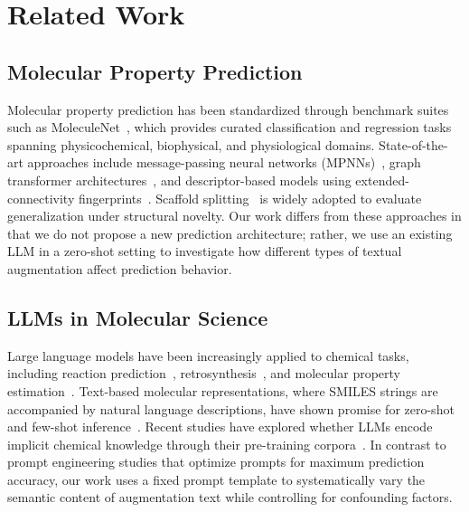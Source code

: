 \section{Related Work}
\label{sec:related_work}

\subsection{Molecular Property Prediction}
Molecular property prediction has been standardized through benchmark suites such as MoleculeNet~\cite{wu2018moleculenet}, which provides curated classification and regression tasks spanning physicochemical, biophysical, and physiological domains. State-of-the-art approaches include message-passing neural networks (MPNNs)~\cite{gilmer2017neural}, graph transformer architectures~\cite{ying2021transformers}, and descriptor-based models using extended-connectivity fingerprints~\cite{rogers2010extended}. Scaffold splitting~\cite{bemis1996properties} is widely adopted to evaluate generalization under structural novelty. Our work differs from these approaches in that we do not propose a new prediction architecture; rather, we use an existing LLM in a zero-shot setting to investigate how different types of textual augmentation affect prediction behavior.

\subsection{LLMs in Molecular Science}
Large language models have been increasingly applied to chemical tasks, including reaction prediction~\cite{schwaller2019molecular}, retrosynthesis~\cite{liu2024retrosynthesis}, and molecular property estimation~\cite{guo2024llm, ross2022large}. Text-based molecular representations, where SMILES strings are accompanied by natural language descriptions, have shown promise for zero-shot and few-shot inference~\cite{edwards2022text2mol}. Recent studies have explored whether LLMs encode implicit chemical knowledge through their pre-training corpora~\cite{white2023assessment}. In contrast to prompt engineering studies that optimize prompts for maximum prediction accuracy, our work uses a fixed prompt template to systematically vary the semantic content of augmentation text while controlling for confounding factors.

